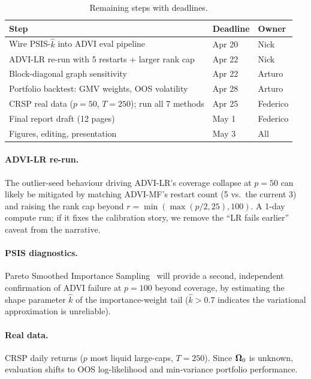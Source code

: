 \documentclass[10pt,conference,compsoc]{IEEEtran}
\begin{document}
\begin{table}[ht]
\centering
\caption{Remaining steps with deadlines.}
\label{tab:remaining}
\small
\begin{tabular}{@{}p{5cm}ll@{}}
\toprule
\textbf{Step} & \textbf{Deadline} & \textbf{Owner} \\
\midrule
Wire PSIS-$\hat{k}$ into ADVI eval pipeline & Apr 20 & Nick \\
ADVI-LR re-run with 5 restarts + larger rank cap & Apr 22 & Nick \\
\midrule
Block-diagonal graph sensitivity & Apr 22 & Arturo \\
Portfolio backtest: GMV weights, OOS volatility & Apr 28 & Arturo \\
\midrule
CRSP real data ($p{=}50$, $T{=}250$); run all 7 methods & Apr 25 & Federico \\
Final report draft (12 pages) & May 1 & Federico \\
\midrule
Figures, editing, presentation & May 3 & All \\
\bottomrule
\end{tabular}
\end{table}

\paragraph{ADVI-LR re-run.} The outlier-seed behaviour driving ADVI-LR's coverage collapse at $p{=}50$ can likely be mitigated by matching ADVI-MF's restart count (5 vs.\ the current 3) and raising the rank cap beyond $r = \min(\max(p/2,25),100)$. A 1-day compute run; if it fixes the calibration story, we remove the ``LR fails earlier'' caveat from the narrative.

\paragraph{PSIS diagnostics.} Pareto Smoothed Importance Sampling~\cite{yao2018} will provide a second, independent confirmation of ADVI failure at $p{=}100$ beyond coverage, by estimating the shape parameter $\hat{k}$ of the importance-weight tail ($\hat{k} > 0.7$ indicates the variational approximation is unreliable).

\paragraph{Real data.} CRSP daily returns ($p$ most liquid large-caps, $T{=}250$). Since $\bm{\Omega}_0$ is unknown, evaluation shifts to OOS log-likelihood and min-variance portfolio performance.
\end{document}
